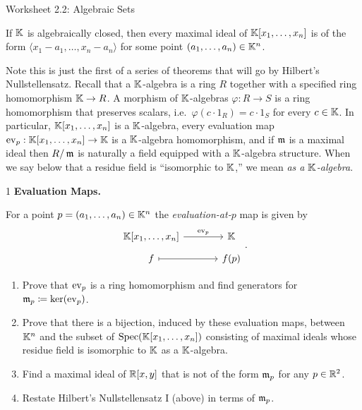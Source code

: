 \documentclass[Notebook.tex]{subfiles}
\begin{document}
\ifSubfilesClassLoaded{}{}


\begin{center}
    {Worksheet 2.2: Algebraic Sets}
\end{center}

 \hrulefill 

\begin{theorem} If $\mathbb K$ is algebraically closed, then every maximal ideal of $\mathbb K[x_1,\ldots,x_n]$ is of the form $\langle x_1-a_1,\ldots,x_n-a_n\rangle$ for some point $(a_1,\ldots,a_n) \in \mathbb K^n$.
\end{theorem}  
 
 Note this is just the first of a series of theorems that will go by Hilbert's Nullstellensatz. Recall that a $\mathbb K$-algebra is a ring $R$ together with a specified ring homomorphism $\mathbb K \to R$. A morphism of $\mathbb K$-algebras $\varphi:R\to S$ is a ring homomorphism that preserves scalars, i.e.\ $\varphi(c\cdot 1_R)=c\cdot 1_S$ for every $c\in \mathbb K$. In particular, $\mathbb K[x_1,\ldots,x_n]$ is a $\mathbb K$-algebra, every evaluation map $\operatorname{ev}_p:\mathbb K[x_1,\ldots,x_n]\to \mathbb K$ is a $\mathbb K$-algebra homomorphism, and if $\operatorname{\mathfrak{m}}$ is a maximal ideal then $R/\operatorname{\mathfrak{m}}$ is naturally a field equipped with a $\mathbb K$-algebra structure. When we say below that a residue field is ``isomorphic to $\mathbb K$,'' we mean \emph{as a $\mathbb K$-algebra}.

 
 \hrulefill 

\newpage

\begin{problem}{1}
    \textbf{Evaluation Maps.} 
    
    For a point $p=(a_1,\ldots,a_n) \in \mathbb K^n$ the \emph{evaluation-at-$p$} map is given by
    \[
    \begin{tikzcd}[row sep =.5em, column sep = 3.5em]
        \K[x_1,\ldots,x_n] \arrow[r, "\ev_p"] & \K \\
        f \arrow[r, mapsto] & f(p)
    \end{tikzcd}.
    \]
    \begin{enumerate}[label=(\alph*),ref=\theenumi\alph*]
        \item Prove that $\operatorname{ev}_p$ is a ring homomorphism and find generators for $\operatorname{\mathfrak{m}}_{p}\coloneqq \ker(\operatorname{ev}_p)$. 
        \item Prove that there is a bijection, induced by these evaluation maps, between $\mathbb K^{n}$ and the subset of $\operatorname{Spec}(\mathbb K[x_1,\ldots,x_n])$ consisting of maximal ideals whose residue field is isomorphic to $\mathbb K$ as a $\mathbb K$-algebra. 
        \item Find a maximal ideal of $\mathbb R[x,y]$ that is not of the form $\operatorname{\mathfrak{m}}_p$ for any $p\in \mathbb R^{2}$. 
        \item Restate Hilbert's Nullstellensatz I (above) in terms of $\operatorname{\mathfrak{m}}_p$. 
    \end{enumerate} 
\end{problem}
\end{document}
